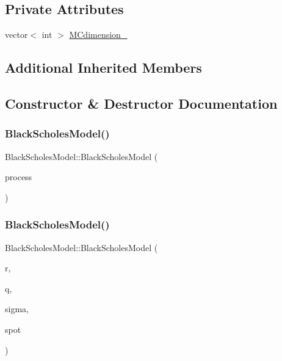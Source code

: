 \subsection*{Private Attributes}
\begin{DoxyCompactItemize}
\item 
vector$<$ int $>$ \hyperlink{class_black_scholes_model_a9457c1edc58d9f737f7eeeaaa6812488}{M\+Cdimension\+\_\+}
\end{DoxyCompactItemize}
\subsection*{Additional Inherited Members}


\subsection{Constructor \& Destructor Documentation}
\hypertarget{class_black_scholes_model_a5cc9ce0cdb0f040da65677b2c07f09b5}{}\label{class_black_scholes_model_a5cc9ce0cdb0f040da65677b2c07f09b5} 
\subsubsection{\texorpdfstring{Black\+Scholes\+Model()}{BlackScholesModel()}\hspace{0.1cm}{\footnotesize\ttfamily [1/2]}}
{\footnotesize\ttfamily Black\+Scholes\+Model\+::\+Black\+Scholes\+Model (\begin{DoxyParamCaption}\item[{std\+::shared\+\_\+ptr$<$ \hyperlink{class_b_s_stochastic_process}{B\+S\+Stochastic\+Process} $>$}]{process }\end{DoxyParamCaption})}

\hypertarget{class_black_scholes_model_a59aa736bd849bc59fed035f702e9813b}{}\label{class_black_scholes_model_a59aa736bd849bc59fed035f702e9813b} 
\subsubsection{\texorpdfstring{Black\+Scholes\+Model()}{BlackScholesModel()}\hspace{0.1cm}{\footnotesize\ttfamily [2/2]}}
{\footnotesize\ttfamily Black\+Scholes\+Model\+::\+Black\+Scholes\+Model (\begin{DoxyParamCaption}\item[{double}]{r,  }\item[{double}]{q,  }\item[{double}]{sigma,  }\item[{double}]{spot }\end{DoxyParamCaption})}



